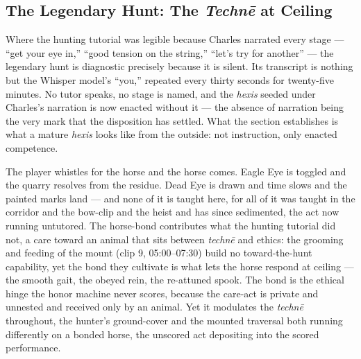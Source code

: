 \documentclass{article}
\begin{document}
\subsection*{The Legendary Hunt: The \textit{Technē} at Ceiling}

Where the hunting tutorial was legible because Charles narrated every stage — ``get your eye in,'' ``good tension on the string,'' ``let's try for another'' — the legendary hunt is diagnostic precisely because it is silent. Its transcript is nothing but the Whisper model's ``you,'' repeated every thirty seconds for twenty-five minutes. No tutor speaks, no stage is named, and the \textit{hexis} seeded under Charles's narration is now enacted without it — the absence of narration being the very mark that the disposition has settled. What the section establishes is what a mature \textit{hexis} looks like from the outside: not instruction, only enacted competence.

The player whistles for the horse and the horse comes. Eagle Eye is toggled and the quarry resolves from the residue. Dead Eye is drawn and time slows and the painted marks land — and none of it is taught here, for all of it was taught in the corridor and the bow-clip and the heist and has since sedimented, the act now running untutored. The horse-bond contributes what the hunting tutorial did not, a care toward an animal that sits between \textit{technē} and ethics: the grooming and feeding of the mount (clip 9, 05:00–07:30) build no toward-the-hunt capability, yet the bond they cultivate is what lets the horse respond at ceiling — the smooth gait, the obeyed rein, the re-attuned spook. The bond is the ethical hinge the honor machine never scores, because the care-act is private and unnested and received only by an animal. Yet it modulates the \textit{technē} throughout, the hunter's ground-cover and the mounted traversal both running differently on a bonded horse, the unscored act depositing into the scored performance.
\end{document}
